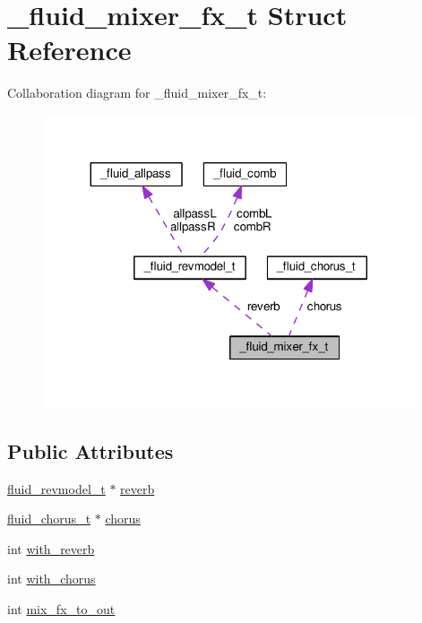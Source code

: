 \hypertarget{struct__fluid__mixer__fx__t}{}\section{\+\_\+fluid\+\_\+mixer\+\_\+fx\+\_\+t Struct Reference}
\label{struct__fluid__mixer__fx__t}


Collaboration diagram for \+\_\+fluid\+\_\+mixer\+\_\+fx\+\_\+t\+:
\nopagebreak
\begin{figure}[H]
\begin{center}
\leavevmode
\includegraphics[width=311pt]{struct__fluid__mixer__fx__t__coll__graph}
\end{center}
\end{figure}
\subsection*{Public Attributes}
\begin{DoxyCompactItemize}
\item 
\hyperlink{fluid__rev_8h_adb084d56733ceb65419acea1967cfe7a}{fluid\+\_\+revmodel\+\_\+t} $\ast$ \hyperlink{struct__fluid__mixer__fx__t_aed2fd7d5928051dd17185375d5af2102}{reverb}
\item 
\hyperlink{fluid__chorus_8h_a56c50ab8cf334a1f7ee727bce6467aec}{fluid\+\_\+chorus\+\_\+t} $\ast$ \hyperlink{struct__fluid__mixer__fx__t_a0c5c6f8f1d3382b4d7c9928f762b69d5}{chorus}
\item 
int \hyperlink{struct__fluid__mixer__fx__t_a2b490d27a74d50f69436fff58836df74}{with\+\_\+reverb}
\item 
int \hyperlink{struct__fluid__mixer__fx__t_a61499e4c11e1e8f1771731e2fedd0402}{with\+\_\+chorus}
\item 
int \hyperlink{struct__fluid__mixer__fx__t_a5d3f2d6aa6e4e6ca958c7eb9adbe54b9}{mix\+\_\+fx\+\_\+to\+\_\+out}
\end{DoxyCompactItemize}


